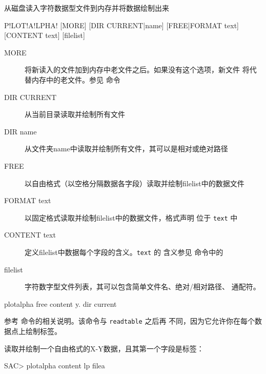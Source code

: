 \label{cmd:plotalpha}

从磁盘读入字符数据型文件到内存并将数据绘制出来

\begin{SACSTX}
P!LOT!A!LPHA! [MORE] [DIR CURRENT|name] [FREE|FORMAT text] [CONTENT text]
    [filelist]
\end{SACSTX}

\begin{description}
\item [MORE] 将新读入的文件加到内存中老文件之后。如果没有这个选项，新文件
    将代替内存中的老文件。参见  命令
\item [DIR CURRENT] 从当前目录读取并绘制所有文件
\item [DIR name] 从文件夹name中读取并绘制所有文件，其可以是相对或绝对路径
\item [FREE] 以自由格式（以空格分隔数据各字段）读取并绘制filelist中的数据文件
\item [FORMAT text] 以固定格式读取并绘制filelist中的数据文件，格式声明
    位于 \texttt{text} 中
\item [CONTENT text] 定义filelist中数据每个字段的含义。\texttt{text} 的
    含义参见  命令中的
\item [filelist] 字符数字型文件列表，其可以包含简单文件名、绝对/相对路径、
    通配符。
\end{description}

\begin{SACDFT}
plotalpha free content y. dir current
\end{SACDFT}

参考  命令的相关说明。该命令与 \texttt{readtable}
之后再  不同，因为它允许你在每个数据点上绘制标签。

读取并绘制一个自由格式的X-Y数据，且其第一个字段是标签：
\begin{SACCode}
SAC> plotalpha content lp filea
\end{SACCode}
